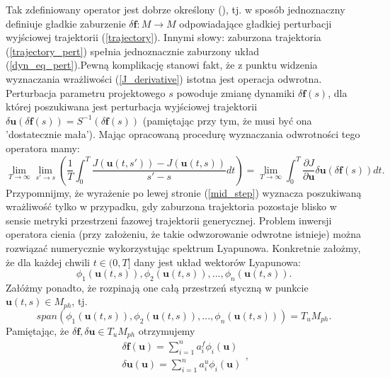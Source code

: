 \documentclass[12pt, twoside]{book}
\begin{document}
Tak zdefiniowany operator jest dobrze określony (\cite{Qiqi1}), tj. w sposób jednoznaczny definiuje gładkie zaburzenie $ \delta \textbf{f}: M \rightarrow M $ odpowiadające gładkiej perturbacji wyjściowej trajektorii (\ref{trajectory}). Innymi słowy: zaburzona trajektoria (\ref{trajectory_pert}) spełnia jednoznacznie zaburzony układ (\ref{dyn_eq_pert}).Pewną komplikację stanowi fakt, że z punktu widzenia wyznaczania wrażliwości (\ref{J_derivative}) istotna jest operacja odwrotna. Perturbacja parametru projektowego $ s $ powoduje zmianę dynamiki $ \delta\textbf{f}(s) $, dla której poszukiwana jest perturbacja wyjściowej trajektorii $ \delta \textbf{u}(\delta \textbf{f}(s))  = S^{-1}(\delta \textbf{f}(s))$ (pamiętając przy tym, że musi być ona 'dostatecznie mała'). Mając opracowaną procedurę wyznaczania odwrotności tego operatora mamy:
\begin{equation}
\lim\limits_{T\to\infty}\lim\limits_{s'\to s}(\frac{1}{T}\int_{0}^{T}\frac{J(\textbf{u}(t,s'))-J(\textbf{u}(t,s))}{s'-s}dt) = \lim\limits_{T\to\infty} \int_{0}^{T} {\frac{\partial{J}}{\partial{\textbf{u}}}\delta \textbf{u}(\delta \textbf{f}(s))}dt.
\label{mid_step}	
\end{equation}
Przypomnijmy, że wyrażenie po lewej stronie (\ref{mid_step}) wyznacza poszukiwaną wrażliwość tylko w przypadku, gdy zaburzona trajektoria pozostaje blisko w sensie metryki przestrzeni fazowej trajektorii generycznej. \newline
Problem inwersji operatora cienia (przy założeniu, że takie odwzorowanie odwrotne istnieje) można rozwiązać numerycznie wykorzystując spektrum Lyapunowa. Konkretnie założmy, że dla każdej chwili $ t \in (0,T] $ dany jest układ wektorów Lyapunowa: 
\begin{equation}
\phi_{1}(\textbf{u}(t,s)), \phi_{2}(\textbf{u}(t,s)), ... , \phi_{n}(\textbf{u}(t,s)).
\label{lyapunov_vectors}
\end{equation}
Załóżmy ponadto, że rozpinają one całą przestrzeń styczną w punkcie $ \textbf{u}(t,s) \in M_{ph} $, tj.
\begin{equation}
span(\phi_{1}(\textbf{u}(t,s)), \phi_{2}(\textbf{u}(t,s)), ... , \phi_{n}(\textbf{u}(t,s))) = T_{u}M_{ph}.
\label{lyapunov_vectors_span}
\end{equation}
Pamiętając, że $ \delta \textbf{f}, \delta \textbf{u} \in T_{u}M_{ph} $ otrzymujemy
\begin{equation}
\begin{array}{rcl} 
\delta \textbf{f}(\textbf{u}) = \sum_{i=1}^{n}a^{f}_{i}\phi_{i}(\textbf{u}) \\
\delta \textbf{u}(\textbf{u}) = \sum_{i=1}^{n}a^{u}_{i}\phi_{i}(\textbf{u})
\end{array},
\end{equation}
\end{document}
